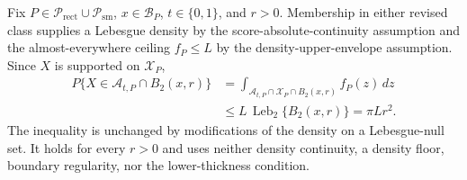 Fix \(P\in\mathcal P_{\mathrm{rect}}\cup\mathcal P_{\mathrm{sm}}\), \(x\in\mathcal B_P\), \(t\in\{0,1\}\), and \(r>0\).  Membership in either revised class supplies a Lebesgue density by the score-absolute-continuity assumption and the almost-everywhere ceiling \(f_P\leq L\) by the density-upper-envelope assumption.  Since \(X\) is supported on \(\mathcal X_P\),
\[
\begin{aligned}
 P\{X\in\mathcal A_{t,P}\cap B_2(x,r)\}
 &=\int_{\mathcal A_{t,P}\cap\mathcal X_P\cap B_2(x,r)}f_P(z)\,dz\\
 &\leq L\,\operatorname{Leb}_2\{B_2(x,r)\}
 =\pi Lr^2.
\end{aligned}
\]
The inequality is unchanged by modifications of the density on a Lebesgue-null set.  It holds for every \(r>0\) and uses neither density continuity, a density floor, boundary regularity, nor the lower-thickness condition.